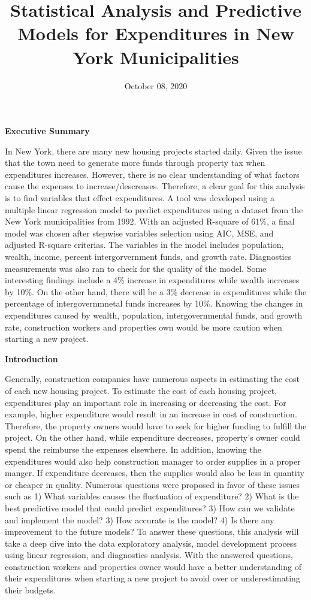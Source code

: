 \documentclass[11pt]{article}\usepackage[]{graphicx}\usepackage[]{color}
\title{Statistical Analysis and Predictive Models for Expenditures in New York Municipalities\vspace{-5ex}}
\date{October 08, 2020\vspace{-5ex}}
\begin{document}
 
\maketitle
\hfill \break








\noindent\textbf{Executive Summary} 

\noindent In New York, there are many new housing projects started daily. Given the issue that the town need to generate more funds through property tax when expenditures increases. However, there is no clear understanding of what factors cause the expenses to increase/descreases. Therefore, a clear goal for this analysis is to find variables that effect expenditures. A tool was developed using a multiple linear regression model to predict expenditures using a dataset from the New York municipalities from 1992. With an adjusted R-square of 61\%, a final model was chosen after stepwise variables selection using AIC, MSE, and adjusted R-square criterias. The variables in the model includes population, wealth, income, percent intergorvernment funds, and growth rate. Diagnostics measurements was also ran to check for the quality of the model. Some interesting findings include a 4\% increase in expenditures while wealth increases by 10\%. On the other hand, there will be a 3\% decrease in expenditures while the percentage of intergovernmnetal funds increases by 10\%. Knowing the changes in expenditures caused by wealth, population, intergovernmental funds, and growth rate, construction workers and properties own would be more caution when starting a new project.            
\hfill \break

\noindent\textbf{Introduction} 

\noindent Generally, construction companies have numerous aspects in estimating the cost of each new housing project. To estimate the cost of each housing project, expenditures play an important role in increasing or decreasing the cost. For example, higher expenditure would result in an increase in cost of construction. Therefore, the property owners would have to seek for higher funding to fulfill the project. On the other hand, while expenditure decreases, property’s owner could spend the reimburse the expenses elsewhere. In addition, knowing the expenditures would also help construction manager to order supplies in a proper manger. If expenditure decreases, then the supplies would also be less in quantity or cheaper in quality. Numerous questions were proposed in favor of these issues such as 1) What variables causes the fluctuation of expenditure? 2) What is the best predictive model that could predict expenditures? 3) How can we validate and implement the model? 3) How accurate is the model? 4) Is there any improvement to the future models? To answer these questions, this analysis will take a deep dive into the data exploratory analysis, model development process using linear regression, and diagnostics analysis. With the answered questions, construction workers and properties owner would have a better understanding of their expenditures when starting a new project to avoid over or underestimating their budgets.
\hfill \break
\end{document}

